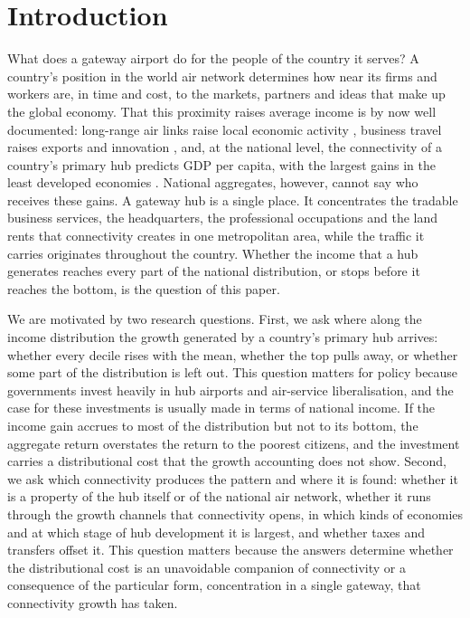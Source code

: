 \linenumbers

\section{Introduction}
\label{sec:intro}
What does a gateway airport do for the people of the country it serves? A country's position in the world air network determines how near its firms and workers are, in time and cost, to the markets, partners and ideas that make up the global economy. That this proximity raises average income is by now well documented: long-range air links raise local economic activity \citep{Campante_2018}, business travel raises exports and innovation \citep{Cristea_2011,Hovhannisyan_2015}, and, at the national level, the connectivity of a country's primary hub predicts GDP per capita, with the largest gains in the least developed economies \citep{Yue_2026}. National aggregates, however, cannot say who receives these gains. A gateway hub is a single place. It concentrates the tradable business services, the headquarters, the professional occupations and the land rents that connectivity creates in one metropolitan area, while the traffic it carries originates throughout the country. Whether the income that a hub generates reaches every part of the national distribution, or stops before it reaches the bottom, is the question of this paper.

We are motivated by two research questions. First, we ask where along the income distribution the growth generated by a country's primary hub arrives: whether every decile rises with the mean, whether the top pulls away, or whether some part of the distribution is left out. This question matters for policy because governments invest heavily in hub airports and air-service liberalisation, and the case for these investments is usually made in terms of national income. If the income gain accrues to most of the distribution but not to its bottom, the aggregate return overstates the return to the poorest citizens, and the investment carries a distributional cost that the growth accounting does not show. Second, we ask which connectivity produces the pattern and where it is found: whether it is a property of the hub itself or of the national air network, whether it runs through the growth channels that connectivity opens, in which kinds of economies and at which stage of hub development it is largest, and whether taxes and transfers offset it. This question matters because the answers determine whether the distributional cost is an unavoidable companion of connectivity or a consequence of the particular form, concentration in a single gateway, that connectivity growth has taken.

